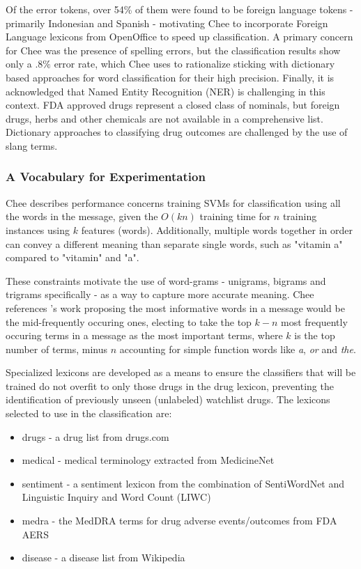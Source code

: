 \documentclass[twoside,11pt]{article}
\begin{document}
Of the error tokens, over 54\% of them were found to be foreign language tokens - primarily Indonesian and Spanish - motivating Chee to incorporate Foreign Language lexicons from OpenOffice to speed up classification. A primary concern for Chee was the presence of spelling errors, but the classification results show only a $.8\%$ error rate, which Chee uses to rationalize sticking with dictionary based approaches for word classification for their high precision. Finally, it is acknowledged that Named Entity Recognition (NER) is challenging in this context. FDA approved drugs represent a closed class of nominals, but foreign drugs, herbs and other chemicals are not available in a comprehensive list. Dictionary approaches to classifying drug outcomes are challenged by the use of slang terms.

\subsubsection{A Vocabulary for Experimentation}
Chee describes performance concerns training SVMs for classification using all the words in the message, given the $O(kn)$ training time for $n$ training instances using $k$ features (words). Additionally, multiple words together in order can convey a different meaning than separate single words, such as "vitamin a" compared to "vitamin" and "a".

These constraints motivate the use of word-grams - unigrams, bigrams and trigrams specifically - as a way to capture more accurate meaning. Chee references \citep{Luhn, 1957}'s work proposing the most informative words in a message would be the mid-frequently occuring ones, electing to take the top $k - n$ most frequently occuring terms in a message as the most important terms, where $k$ is the top number of terms, minus $n$ accounting for simple function words like \textit{a}, \textit{or} and \textit{the}.

Specialized lexicons are developed as a means to ensure the classifiers that will be trained do not overfit to only those drugs in the drug lexicon, preventing the identification of previously unseen (unlabeled) watchlist drugs. The lexicons selected to use in the classification are:
\begin{itemize}
  \item drugs - a drug list from drugs.com
  \item medical - medical terminology extracted from MedicineNet
  \item sentiment - a sentiment lexicon from the combination of SentiWordNet and Linguistic Inquiry and Word Count (LIWC)
  \item medra - the MedDRA terms for drug adverse events/outcomes from FDA AERS
  \item disease - a disease list from Wikipedia
\end{itemize}
\end{document}
